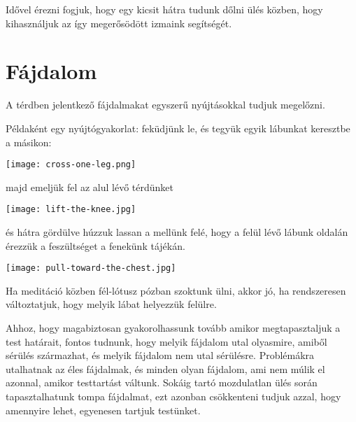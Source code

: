 \documentclass[12pt,oneside,landscape,final]{memoir}
\begin{document}
Idővel érezni fogjuk, hogy egy kicsit hátra tudunk dőlni ülés közben, hogy
kihasználjuk az így megerősödött izmaink segítségét.

\section{Fájdalom}

A térdben jelentkező fájdalmakat egyszerű nyújtásokkal tudjuk megelőzni.

\clearpage

Példaként egy nyújtógyakorlat: feküdjünk le, és tegyük egyik lábunkat keresztbe
a másikon:

{\centering\par
\texttt{[image: cross-one-leg.png]}%
\par}

majd emeljük fel az alul lévő térdünket

{\centering\par
\texttt{[image: lift-the-knee.jpg]}%
\par}

és hátra gördülve húzzuk lassan a mellünk felé, hogy a felül lévő lábunk oldalán
érezzük a feszültséget a fenekünk tájékán.

{\centering\par
\texttt{[image: pull-toward-the-chest.jpg]}%
\par}

Ha meditáció közben fél-lótusz pózban szoktunk ülni, akkor jó, ha rendszeresen
változtatjuk, hogy melyik lábat helyezzük felülre.

Ahhoz, hogy magabiztosan gyakorolhassunk tovább amikor megtapasztaljuk a test
határait, fontos tudnunk, hogy melyik fájdalom utal olyasmire, amiből sérülés
származhat, és melyik fájdalom nem utal sérülésre. Problémákra utalhatnak az
éles fájdalmak, és minden olyan fájdalom, ami nem múlik el azonnal, amikor
testtartást váltunk. Sokáig tartó mozdulatlan ülés során tapasztalhatunk tompa
fájdalmat, ezt azonban csökkenteni tudjuk azzal, hogy amennyire lehet, egyenesen
tartjuk testünket.
\end{document}
